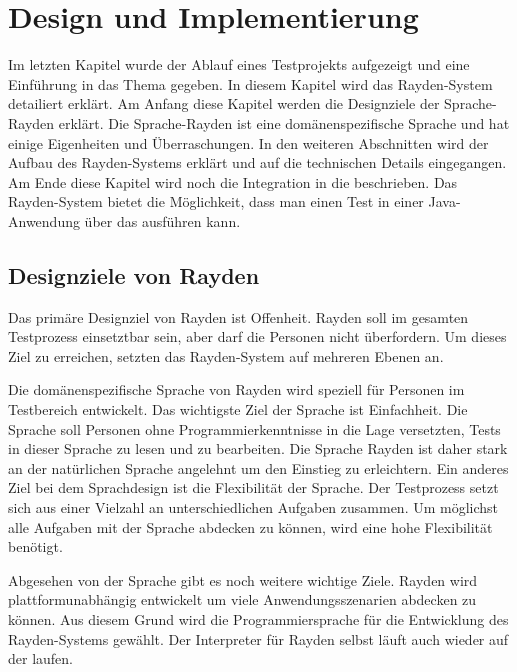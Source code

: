 \chapter{Design und Implementierung}
\label{cha:DesignUndImplementierung}

Im letzten Kapitel wurde der Ablauf eines Testprojekts aufgezeigt und eine Einführung in das Thema  gegeben. In diesem Kapitel wird das Rayden-System detailiert erklärt. Am Anfang diese Kapitel werden die Designziele der Sprache-Rayden erklärt. Die Sprache-Rayden ist eine domänenspezifische Sprache und hat einige Eigenheiten und Überraschungen. In den weiteren Abschnitten wird der Aufbau des Rayden-Systems erklärt und auf die technischen Details eingegangen. Am Ende diese Kapitel wird noch die Integration in die  beschrieben. Das Rayden-System bietet die Möglichkeit, dass man einen Test in einer Java-Anwendung über das  ausführen kann.


\section{Designziele von Rayden}

Das primäre Designziel von Rayden ist Offenheit. Rayden soll im gesamten Testprozess einsetztbar sein, aber darf die Personen nicht überfordern. Um dieses Ziel zu erreichen, setzten das Rayden-System auf mehreren Ebenen an.

\SuperPar
Die domänenspezifische Sprache von Rayden wird speziell für Personen im Testbereich entwickelt. Das wichtigste Ziel der Sprache ist Einfachheit. Die Sprache soll Personen ohne Programmierkenntnisse in die Lage versetzten, Tests in dieser Sprache zu lesen und zu bearbeiten. Die Sprache Rayden ist daher stark an der natürlichen Sprache angelehnt um den Einstieg zu erleichtern. Ein anderes Ziel bei dem Sprachdesign ist die Flexibilität der Sprache. Der Testprozess setzt sich aus einer Vielzahl an unterschiedlichen Aufgaben zusammen. Um möglichst alle Aufgaben mit der Sprache abdecken zu können, wird eine hohe Flexibilität benötigt. 

\SuperPar
Abgesehen von der Sprache gibt es noch weitere wichtige Ziele. Rayden wird plattformunabhängig entwickelt um viele Anwendungsszenarien abdecken zu können. Aus diesem Grund wird die Programmiersprache  für die Entwicklung des Rayden-Systems gewählt. Der Interpreter für Rayden selbst läuft auch wieder auf der  laufen.

